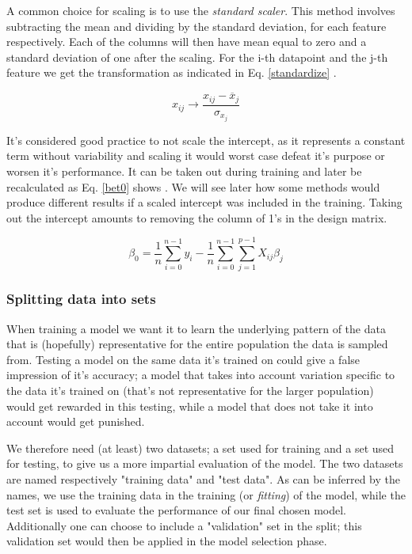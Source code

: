 A common choice for scaling is to use the \textit{standard scaler}. This method involves subtracting the mean and dividing by the standard deviation, for each feature respectively. Each of the columns will then have mean equal to zero and a standard deviation of one after the scaling. For the i-th datapoint and the j-th feature we get the transformation as indicated in Eq. \ref{standardize} \citep[Linear Regression]{morten}.

\begin{equation}\label{standardize}
    x_{ij} \rightarrow \frac{x_{ij}-\overline{x}_j}{\sigma_{x_j}}
\end{equation}

It's considered good practice to not scale the intercept, as it represents a constant term without variability and scaling it would worst case defeat it's purpose or worsen it's performance. It can be taken out during training and later be recalculated as Eq. \ref{bet0} shows \citep[Resampling methods]{morten}. We will see later how some methods would produce different results if a scaled intercept was included in the training. Taking out the intercept amounts to removing the column of 1's in the design matrix. 

\begin{equation}\label{bet0}
    \beta_0 = \frac{1}{n}\sum_{i=0}^{n-1}y_i - \frac{1}{n}\sum_{i=0}^{n-1}\sum_{j=1}^{p-1}X_{ij}\beta_j
\end{equation}

\subsubsection{Splitting data into sets}\label{overfitting}

When training a model we want it to learn the underlying pattern of the data that is (hopefully) representative for the entire population the data is sampled from. 
Testing a model on the same data it's trained on could give a false impression of it's accuracy; a model that takes into account variation specific to the data it's trained on (that's not representative for the larger population) would get rewarded in this testing, while a model that does not take it into account would get punished. 

We therefore need (at least) two datasets; a set used for training and a set used for testing, to give us a more impartial evaluation of the model. The two datasets are named respectively "training data" and "test data". As can be inferred by the names, we use the training data in the training (or \textit{fitting}) of the model, while the test set is used to evaluate the performance of our final chosen model. 
Additionally one can choose to include a "validation" set in the split; this validation set would then be applied in the model selection phase.

